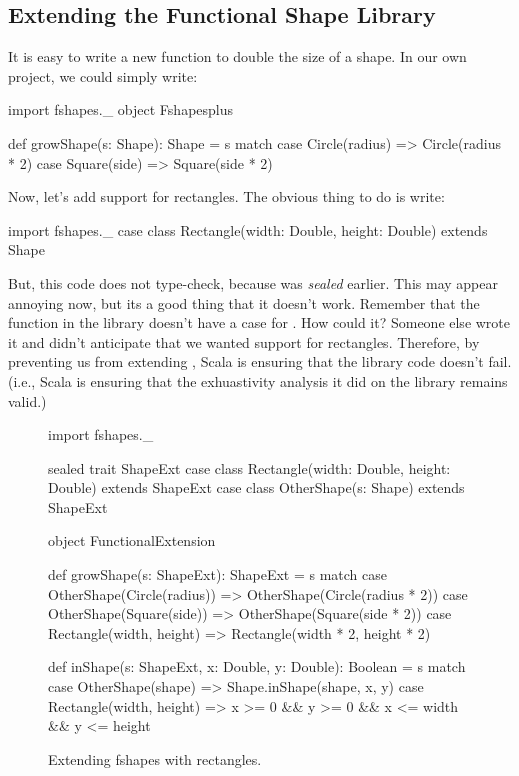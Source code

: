 \documentclass{book}
\begin{document}
\subsection{Extending the Functional Shape Library}

It is easy to write a new function to double the size of a shape. In our
own project, we could simply write:

\begin{scalacode}
import fshapes._
object Fshapesplus {

  def growShape(s: Shape): Shape = s match {
    case Circle(radius) => Circle(radius * 2)
    case Square(side) => Square(side * 2)
  }

}
\end{scalacode}

Now, let's add support for rectangles. The obvious thing to do is write:
\begin{scalacode}
import fshapes._
case class Rectangle(width: Double, height: Double) extends Shape
\end{scalacode}
But, this code does not type-check, because  was \emph{sealed}
earlier. This may appear annoying now, but its a good thing that it doesn't work.
Remember that the  function in the library doesn't
have a case for . How could it? Someone else wrote it
and didn't anticipate that we wanted support for rectangles. Therefore, by
preventing us from extending , Scala is ensuring that
the library code doesn't fail. (i.e., Scala is ensuring that the exhuastivity
analysis it did on the library remains valid.)

\begin{figure}
\begin{scalacode}
import fshapes._

sealed trait ShapeExt
case class Rectangle(width: Double, height: Double) extends ShapeExt
case class OtherShape(s: Shape) extends ShapeExt

object FunctionalExtension {

  def growShape(s: ShapeExt): ShapeExt = s match {
    case OtherShape(Circle(radius)) => OtherShape(Circle(radius * 2))
    case OtherShape(Square(side)) => OtherShape(Square(side * 2))
    case Rectangle(width, height) => Rectangle(width * 2, height * 2)
  }

  def inShape(s: ShapeExt, x: Double, y: Double): Boolean = s match {
    case OtherShape(shape) => Shape.inShape(shape, x, y)
    case Rectangle(width, height) => {
      x >= 0 && y >= 0 && x <= width && y <= height
    }
  }
}
\end{scalacode}
\caption{Extending fshapes with rectangles.}
\label{fshapesext}
\end{figure}
\end{document}
